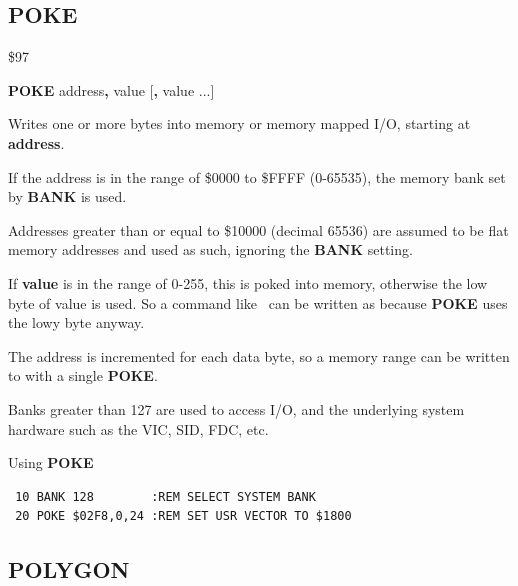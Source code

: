 \subsection{POKE}
\begin{description}[leftmargin=2cm,style=nextline]
\item [Token:] \$97
\item [Format:] {\bf POKE} address{\bf,} value [{\bf,} value ...]
\item [Usage:]  Writes one or more bytes into memory
                or memory mapped I/O, starting at {\bf address}.

                If the address is in the range of \$0000 to \$FFFF (0-65535), the
                memory bank set by {\bf BANK} is used.

                Addresses greater than or equal to \$10000 (decimal 65536) are assumed to be flat memory
                addresses and used as such, ignoring the {\bf BANK} setting.

                If {\bf value} is in the range of 0-255, this is poked into memory,
                otherwise the low byte of value is used. So a command like
                 can be written as
                 because {\bf POKE} uses the lowy byte anyway.


\item [Remarks:] The address is incremented for each data byte,
                 so a memory range can be written to with a single {\bf POKE}.

                 Banks greater than 127 are used to access I/O, and the underlying system hardware such as the
                 VIC, SID, FDC, etc.


\item [Example:] Using {\bf POKE}

\begin{tcolorbox}[colback=black,coltext=white]
\verbatimfont{\codefont}
\begin{verbatim}
 10 BANK 128        :REM SELECT SYSTEM BANK
 20 POKE $02F8,0,24 :REM SET USR VECTOR TO $1800
\end{verbatim}
\end{tcolorbox}
\end{description}


\newpage
\subsection{POLYGON}

